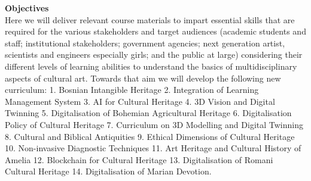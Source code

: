 \textbf{Objectives}\\
Here we will deliver relevant course materials to impart essential skills that are required for the various stakeholders and target audiences (academic students and staff; institutional stakeholders; government agencies; next generation artist, scientists and engineers especially girls; and the public at large) considering their different levels of learning abilities to understand the basics of multidisciplinary aspects of cultural art. Towards that aim we will develop the following new curriculum: 1. Bosnian Intangible Heritage 2. Integration of Learning Management System 3. AI for Cultural Heritage 4. 3D Vision and Digital Twinning 5. Digitalisation of Bohemian Agricultural Heritage 6. Digitalisation Policy of Cultural Heritage 7. Curriculum on 3D Modelling and Digital Twinning 8. Cultural and Biblical Antiquities 9. Ethical Dimensions of Cultural Heritage 10. Non-invasive Diagnostic Techniques 11. Art Heritage and Cultural History of Amelia 12. Blockchain for Cultural Heritage 13. Digitalisation of Romani Cultural Heritage 14. Digitalisation of Marian Devotion.
\par

